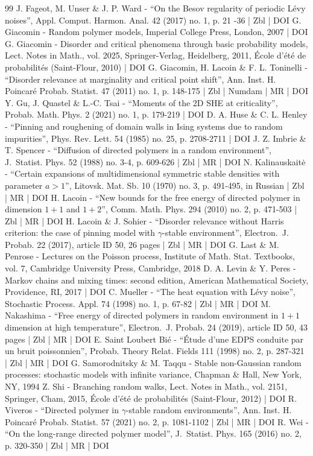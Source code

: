 \begin{thebibliography}{99}
J. Fageot, M. Unser \& J. P. Ward - “On the Besov regularity of periodic Lévy noises”, Appl. Comput. Harmon. Anal. 42 (2017) no. 1, p. 21 -36 | Zbl | DOI
G. Giacomin - Random polymer models, Imperial College Press, London, 2007 | DOI
G. Giacomin - Disorder and critical phenomena through basic probability models, Lect. Notes in Math., vol. 2025, Springer-Verlag, Heidelberg, 2011, École d’été de probabilités (Saint-Flour, 2010) | DOI
G. Giacomin, H. Lacoin \& F. L. Toninelli - “Disorder relevance at marginality and critical point shift”, Ann. Inst. H. Poincaré Probab. Statist. 47 (2011) no. 1, p. 148-175 | Zbl | Numdam | MR | DOI
Y. Gu, J. Quastel \& L.-C. Tsai - “Moments of the 2D SHE at criticality”, Probab. Math. Phys. 2 (2021) no. 1, p. 179-219 | DOI
D. A. Huse \& C. L. Henley - “Pinning and roughening of domain walls in Ising systems due to random impurities”, Phys. Rev. Lett. 54 (1985) no. 25, p. 2708-2711 | DOI
J. Z. Imbrie \& T. Spencer - “Diffusion of directed polymers in a random environment”, J. Statist. Phys. 52 (1988) no. 3-4, p. 609-626 | Zbl | MR | DOI
N. Kalinauskaitė - “Certain expansions of multidimensional symmetric stable densities with parameter $a>1$”, Litovsk. Mat. Sb. 10 (1970) no. 3, p. 491-495, in Russian | Zbl | MR | DOI
H. Lacoin - “New bounds for the free energy of directed polymer in dimension $1+1$ and $1+2$”, Comm. Math. Phys. 294 (2010) no. 2, p. 471-503 | Zbl | MR | DOI
H. Lacoin \& J. Sohier - “Disorder relevance without Harris criterion: the case of pinning model with $\gamma $-stable environment”, Electron. J. Probab. 22 (2017), article ID 50, 26 pages | Zbl | MR | DOI
G. Last \& M. Penrose - Lectures on the Poisson process, Institute of Math. Stat. Textbooks, vol. 7, Cambridge University Press, Cambridge, 2018
D. A. Levin \& Y. Peres - Markov chains and mixing times: second edition, American Mathematical Society, Providence, RI, 2017 | DOI
C. Mueller - “The heat equation with Lévy noise”, Stochastic Process. Appl. 74 (1998) no. 1, p. 67-82 | Zbl | MR | DOI
M. Nakashima - “Free energy of directed polymers in random environment in $1+1$ dimension at high temperature”, Electron. J. Probab. 24 (2019), article ID 50, 43 pages | Zbl | MR | DOI
E. Saint Loubert Bié - “Étude d’une EDPS conduite par un bruit poissonnien”, Probab. Theory Relat. Fields 111 (1998) no. 2, p. 287-321 | Zbl | MR | DOI
G. Samorodnitsky \& M. Taqqu - Stable non-Gaussian random processes: stochastic models with infinite variance, Chapman \& Hall, New York, NY, 1994
Z. Shi - Branching random walks, Lect. Notes in Math., vol. 2151, Springer, Cham, 2015, École d’été de probabilités (Saint-Flour, 2012) | DOI
R. Viveros - “Directed polymer in $\gamma $-stable random environments”, Ann. Inst. H. Poincaré Probab. Statist. 57 (2021) no. 2, p. 1081-1102 | Zbl | MR | DOI
R. Wei - “On the long-range directed polymer model”, J. Statist. Phys. 165 (2016) no. 2, p. 320-350 | Zbl | MR | DOI
\end{thebibliography}
